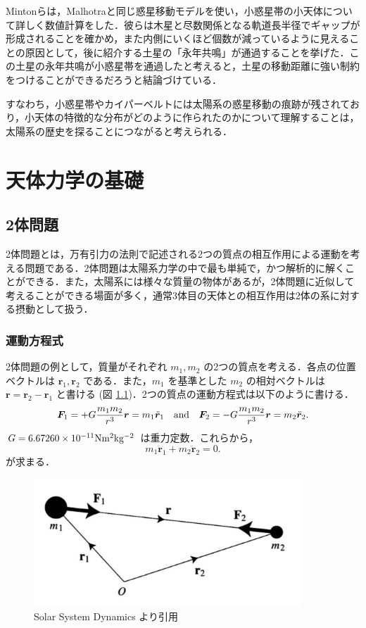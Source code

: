 \documentclass[11pt,a4paper,oneside,onecolumn]{jreport}
\begin{document}
Mintonらは，Malhotraと同じ惑星移動モデルを使い，小惑星帯の小天体について詳しく数値計算をした\cite{Minton}．彼らは木星と尽数関係となる軌道長半径でギャップが形成されることを確かめ，また内側にいくほど個数が減っているように見えることの原因として，後に紹介する土星の「永年共鳴」が通過することを挙げた．この土星の永年共鳴が小惑星帯を通過したと考えると，土星の移動距離に強い制約をつけることができるだろうと結論づけている．

すなわち，小惑星帯やカイパーベルトには太陽系の惑星移動の痕跡が残されており，小天体の特徴的な分布がどのように作られたのかについて理解することは，太陽系の歴史を探ることにつながると考えられる．


\chapter{天体力学の基礎}
\section{2体問題 \label{sec:2body}}
2体問題とは，万有引力の法則で記述される2つの質点の相互作用による運動を考える問題である．2体問題は太陽系力学の中で最も単純で，かつ解析的に解くことができる．また，太陽系には様々な質量の物体があるが，2体問題に近似して考えることができる場面が多く，通常3体目の天体との相互作用は2体の系に対する摂動として扱う．
\subsection{運動方程式 \label{sec:EoM}}
2体問題の例として，質量がそれぞれ $m_1, m_2$ の2つの質点を考える．各点の位置ベクトルは ${\bm r}_1, {\bm r}_2$ である．また，$m_1$ を基準とした $m_2$ の相対ベクトルは ${\bm r} = {\bm r}_2 - {\bm r}_1$ と書ける (図 \ref{fig:2body})．2つの質点の運動方程式は以下のように書ける．
\begin{equation}
{\bm F}_1 = + G \frac{m_1 m_2}{r^3} {\bm r} = m_1 \ddot{{\bm r}}_1 \quad {\rm and} \quad {\bm F}_2 = - G \frac{m_1 m_2}{r^3} {\bm r} = m_2 \ddot{{\bm r}}_2. \label{eq:F}
\end{equation}
$G = 6.67260 \times 10^{-11} {\rm N m^2 kg^{-2}}$ は重力定数．これらから，
\begin{equation}
m_1 \ddot{{\bm r}}_1 + m_2 \ddot{{\bm r}}_2 = 0. \label{eq:mr}
\end{equation}
が求まる．

\begin{figure}[H]
\centering
\includegraphics[width=10cm]{./image/sec2_1.pdf}
\caption{Solar System Dynamics\cite{SSD} より引用 \label{fig:2body}}
\end{figure}
\end{document}
